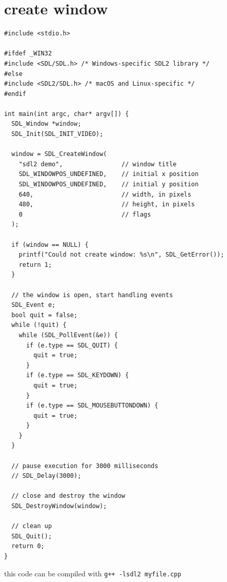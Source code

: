 \documentclass[a4paper,12pt]{article}
\begin{document}
\section{create window}
\label{sec:org18efafd}
\lstset{language=C++,label= ,caption= ,captionpos=b,numbers=none}
\begin{lstlisting}
#include <stdio.h>

#ifdef _WIN32
#include <SDL/SDL.h> /* Windows-specific SDL2 library */
#else
#include <SDL2/SDL.h> /* macOS and Linux-specific */
#endif

int main(int argc, char* argv[]) {
  SDL_Window *window;
  SDL_Init(SDL_INIT_VIDEO);

  window = SDL_CreateWindow(
    "sdl2 demo",                // window title
    SDL_WINDOWPOS_UNDEFINED,    // initial x position
    SDL_WINDOWPOS_UNDEFINED,    // initial y position
    640,                        // width, in pixels
    480,                        // height, in pixels
    0                           // flags
  );

  if (window == NULL) {
    printf("Could not create window: %s\n", SDL_GetError());
    return 1;
  }

  // the window is open, start handling events
  SDL_Event e;
  bool quit = false;
  while (!quit) {
    while (SDL_PollEvent(&e)) {
      if (e.type == SDL_QUIT) {
        quit = true;
      }
      if (e.type == SDL_KEYDOWN) {
        quit = true;
      }
      if (e.type == SDL_MOUSEBUTTONDOWN) {
        quit = true;
      }
    }
  }

  // pause execution for 3000 milliseconds
  // SDL_Delay(3000);

  // close and destroy the window
  SDL_DestroyWindow(window);

  // clean up
  SDL_Quit();
  return 0;
}
\end{lstlisting}

this code can be compiled with \texttt{g++ -lsdl2 myfile.cpp}\\
\end{document}
